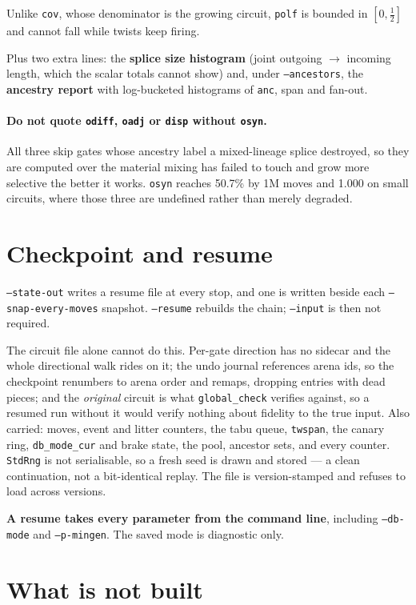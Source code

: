 \documentclass[11pt]{article}
\begin{document}
Unlike \texttt{cov}, whose denominator is the growing circuit, \texttt{polf} is
bounded in $[0,\tfrac12]$ and cannot fall while twists keep firing.

Plus two extra lines: the \textbf{splice size histogram} (joint outgoing
$\to$ incoming length, which the scalar totals cannot show) and, under
\texttt{--ancestors}, the \textbf{ancestry report} with log-bucketed histograms
of \texttt{anc}, span and fan-out.

\paragraph{Do not quote \texttt{odiff}, \texttt{oadj} or \texttt{disp} without
\texttt{osyn}.} All three skip gates whose ancestry label a mixed-lineage splice
destroyed, so they are computed over the material mixing has failed to touch and
grow more selective the better it works. \texttt{osyn} reaches 50.7\% by 1M moves
and 1.000 on small circuits, where those three are undefined rather than merely
degraded.

\section{Checkpoint and resume}

\texttt{--state-out} writes a resume file at every stop, and one is written
beside each \texttt{--snap-every-moves} snapshot. \texttt{--resume} rebuilds the
chain; \texttt{--input} is then not required.

The circuit file alone cannot do this. Per-gate direction has no sidecar and the
whole directional walk rides on it; the undo journal references arena ids, so the
checkpoint renumbers to arena order and remaps, dropping entries with dead
pieces; and the \emph{original} circuit is what \texttt{global_check} verifies
against, so a resumed run without it would verify nothing about fidelity to the
true input. Also carried: moves, event and litter counters, the tabu queue,
\texttt{twspan}, the canary ring, \texttt{db_mode_cur} and brake state, the pool,
ancestor sets, and every counter. \texttt{StdRng} is not serialisable, so a fresh
seed is drawn and stored --- a clean continuation, not a bit-identical replay.
The file is version-stamped and refuses to load across versions.

\textbf{A resume takes every parameter from the command line}, including
\texttt{--db-mode} and \texttt{--p-mingen}. The saved mode is diagnostic only.

\section{What is not built}
\end{document}
